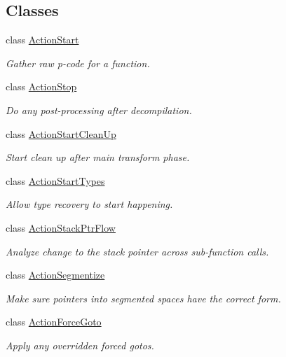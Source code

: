 \subsection*{Classes}
\begin{DoxyCompactItemize}
\item 
class \mbox{\hyperlink{class_action_start}{Action\+Start}}
\begin{DoxyCompactList}\small\item\em Gather raw p-\/code for a function. \end{DoxyCompactList}\item 
class \mbox{\hyperlink{class_action_stop}{Action\+Stop}}
\begin{DoxyCompactList}\small\item\em Do any post-\/processing after decompilation. \end{DoxyCompactList}\item 
class \mbox{\hyperlink{class_action_start_clean_up}{Action\+Start\+Clean\+Up}}
\begin{DoxyCompactList}\small\item\em Start clean up after main transform phase. \end{DoxyCompactList}\item 
class \mbox{\hyperlink{class_action_start_types}{Action\+Start\+Types}}
\begin{DoxyCompactList}\small\item\em Allow type recovery to start happening. \end{DoxyCompactList}\item 
class \mbox{\hyperlink{class_action_stack_ptr_flow}{Action\+Stack\+Ptr\+Flow}}
\begin{DoxyCompactList}\small\item\em Analyze change to the stack pointer across sub-\/function calls. \end{DoxyCompactList}\item 
class \mbox{\hyperlink{class_action_segmentize}{Action\+Segmentize}}
\begin{DoxyCompactList}\small\item\em Make sure pointers into segmented spaces have the correct form. \end{DoxyCompactList}\item 
class \mbox{\hyperlink{class_action_force_goto}{Action\+Force\+Goto}}
\begin{DoxyCompactList}\small\item\em Apply any overridden forced gotos. \end{DoxyCompactList}\item 

\end{DoxyCompactItemize}
